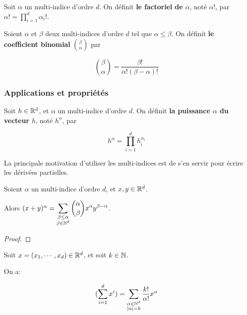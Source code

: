 \begin{definition}
	Soit $\alpha$ un multi-indice d'ordre $d$.
	On définit \textbf{le factoriel de $\alpha$}, noté $\alpha!$, par $\alpha! =
	\displaystyle \prod_{i = 1}^{d} \alpha_{i} !$.
\end{definition}

\begin{definition}
	Soient $\alpha$ et $\beta$ deux multi-indices d'ordre $d$ tel que $\alpha
	\leq \beta$.
	On définit \textbf{le coefficient binomial} $\displaystyle \binom{\beta}{\alpha}$ par

	\begin{equation*}
		\displaystyle \binom{\beta}{\alpha} = \frac{\beta!}{\alpha! (\beta -
		\alpha)!}
	\end{equation*}
\end{definition}

\subsubsection{Applications et propriétés}

\begin{definition}
	Soit $h \in \mathbb{R}^{d}$, et $\alpha$ un multi-indice d'ordre $d$.
	On définit \textbf{la puissance $\alpha$ du vecteur $h$}, noté $h^{\alpha}$,
	par

	\begin{equation*}
		h^{\alpha} = \displaystyle \prod_{i = 1}^{d} h_{i}^{\alpha_{i}}
	\end{equation*}
\end{definition}

La principale motivation d'utiliser les multi-indices est de s'en servir pour
écrire les dérivées partielles.


\begin{proposition} 
	Soient $\alpha$ un multi-indice d'ordre $d$, et $x, y \in \mathbb{R}^{d}$.

	Alors $(x + y)^{\alpha} = \displaystyle \sum_{\substack{\beta \leq \alpha \\ \beta \in
		\mathbb{N}^{d}}} \binom{\alpha}{\beta} x^{\alpha} y^{\beta - \alpha}$.
\end{proposition}

\ifdefined\outputproof
\begin{proof}

\end{proof}
\fi

\begin{proposition}
	Soit $x = (x_{1}, \cdots, x_{d}) \in \mathbb{R}^{d}$, et soit $k \in \mathbb{N}$.

	On a:

	\begin{equation*}
		\displaystyle (\sum_{i = 1}^{d} x^{i}) = \sum_{\substack{\alpha \in
			\mathbb{N}^{d} \\ |\alpha| = k}} \frac{k!}{\alpha!}
			x^{\alpha}
	\end{equation*}
\end{proposition}

